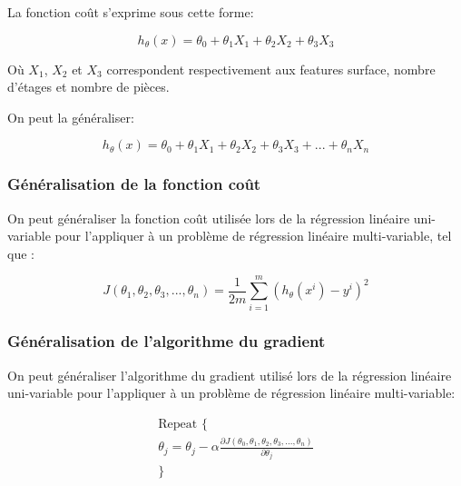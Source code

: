 La fonction coût s'exprime sous cette forme: 

\begin{equation}
	h_\theta(x) = \theta_0 + \theta_1X_1 + \theta_2X_2 + \theta_3X_3
\end{equation}

Où $X_1$, $X_2$ et $X_3$ correspondent respectivement aux features surface, nombre d'étages et nombre de pièces.

On peut la généraliser: 

\begin{equation}
h_\theta(x) = \theta_0 + \theta_1X_1 + \theta_2X_2 + \theta_3X_3 + ... + \theta_nX_n
\label{hypotesis multivar}
\end{equation}


\subsubsection{Généralisation de la fonction coût}
\label{Le Machine Learning:Les différents algorithmes d'apprentissage supervisé: La regression linéaire multi-variable: Généralisation de la fonction coût}
On peut généraliser la fonction coût utilisée lors de la régression linéaire uni-variable pour l'appliquer à un problème de régression linéaire multi-variable, tel que :

\begin{equation}
J(\theta_1,\theta_2,\theta_3,...,\theta_n) =  \frac{1}{2m}\sum_{i=1}^{m}(h_\theta(x^i)-y^{i})^2
\end{equation}


\subsubsection{Généralisation de l'algorithme du gradient}
\label{Le Machine Learning:Les différents algorithmes d'apprentissage supervisé: La regression linéaire multi-variable: Généralisation de l'algorithme du gradient}
On peut généraliser l'algorithme du gradient utilisé lors de la régression linéaire uni-variable pour l'appliquer à un problème de régression linéaire multi-variable:
 
\begin{equation}
\begin{split}
\text{Repeat \{} \\
\theta_j = \theta_j - \alpha \frac{\partial J(\theta_0, \theta_1, \theta_2, \theta_3, ... , \theta_n)}{\partial\theta_j} \\
\text{\}} \\
\end{split}
\end{equation}

